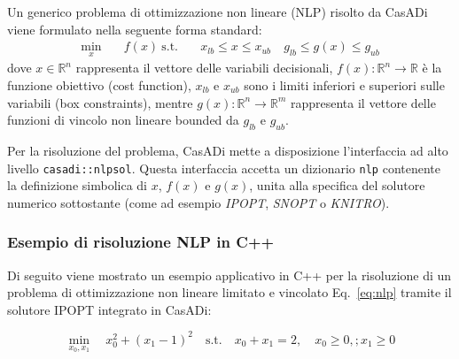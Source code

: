 Un generico problema di ottimizzazione non lineare (NLP) risolto da CasADi viene formulato nella seguente forma standard:
\begin{equation}
\begin{aligned}
\min_{x} \quad & f(x) \
\textrm{s.t.} \quad & x_{lb} \le x \le x_{ub} \
& g_{lb} \le g(x) \le g_{ub}
\end{aligned}
\end{equation}
dove $x \in \mathbb{R}^n$ rappresenta il vettore delle variabili decisionali, $f(x): \mathbb{R}^n \to \mathbb{R}$ è la funzione obiettivo (cost function), $x_{lb}$ e $x_{ub}$ sono i limiti inferiori e superiori sulle variabili (box constraints), mentre $g(x): \mathbb{R}^n \to \mathbb{R}^m$ rappresenta il vettore delle funzioni di vincolo non lineare bounded da $g_{lb}$ e $g_{ub}$.

Per la risoluzione del problema, CasADi mette a disposizione l'interfaccia ad alto livello \texttt{casadi::nlpsol}. Questa interfaccia accetta un dizionario \texttt{nlp} contenente la definizione simbolica di $x$, $f(x)$ e $g(x)$, unita alla specifica del solutore numerico sottostante (come ad esempio \textit{IPOPT}, \textit{SNOPT} o \textit{KNITRO}).

\subsubsection{Esempio di risoluzione NLP in C++}
Di seguito viene mostrato un esempio applicativo in C++ per la risoluzione di un problema di ottimizzazione non lineare limitato e vincolato Eq.~\ref{eq:nlp} tramite il solutore IPOPT integrato in CasADi:

\begin{equation}
\min_{x_0, x_1} \quad x_0^2 + (x_1 - 1)^2 \quad \textrm{s.t.} \quad x_0 + x_1 = 2, \quad x_0 \ge 0, ; x_1 \ge 0
\label{eq:nlp}
\end{equation}

